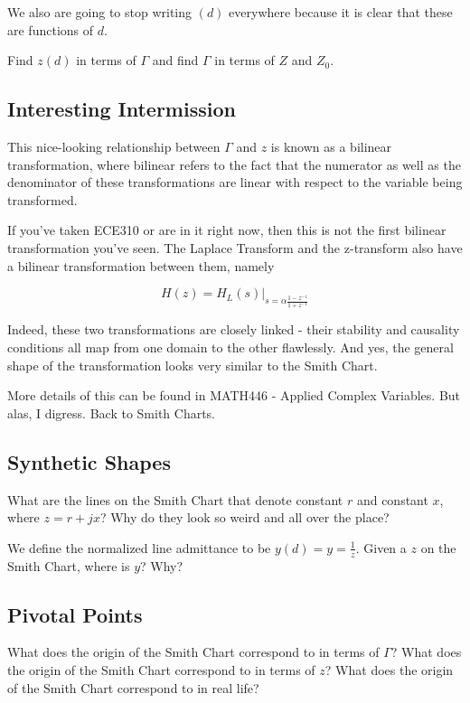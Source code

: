 \documentclass{article}
\begin{document}
We also are going to stop writing $(d)$ everywhere because it is clear that these are functions of $d$.

Find $z(d)$ in terms of $\Gamma$ and find $\Gamma$ in terms of $Z$ and $Z_0$.

\vspace{3cm}

\subsection{Interesting Intermission}

This nice-looking relationship between $\Gamma$ and $z$ is known as a bilinear transformation, where bilinear refers to the fact that the numerator as well as the denominator of these transformations are linear with respect to the variable being transformed.

If you've taken ECE310 or are in it right now, then this is not the first bilinear transformation you've seen. The Laplace Transform and the z-transform also have a bilinear transformation between them, namely

$$H(z) = H_L(s) \vert_{s = \alpha \frac{1 - z^{-1}}{1+z^{-1}}}$$

Indeed, these two transformations are closely linked - their stability and causality conditions all map from one domain to the other flawlessly. And yes, the general shape of the transformation looks very similar to the Smith Chart.

More details of this can be found in MATH446 - Applied Complex Variables. But alas, I digress. Back to Smith Charts.

\subsection{Synthetic Shapes}

What are the lines on the Smith Chart that denote constant $r$ and constant $x$, where $z = r + jx$? Why do they look so weird and all over the place?

We define the normalized line admittance to be $y(d) = y = \frac{1}{z}$. Given a $z$ on the Smith Chart, where is $y$? Why?

\vspace{5cm}

\subsection{Pivotal Points}

What does the origin of the Smith Chart correspond to in terms of $\Gamma$? What does the origin of the Smith Chart correspond to in terms of $z$? What does the origin of the Smith Chart correspond to in real life?
\end{document}
